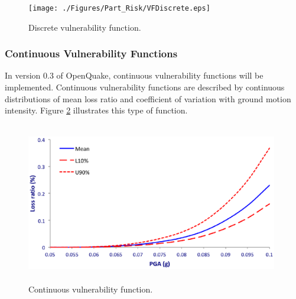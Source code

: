\begin{figure}[ht]
\centering
\texttt{[image: ./Figures/Part\_Risk/VFDiscrete.eps]}
\caption{Discrete vulnerability function.}
\label{fig:VFDiscrete}
\end{figure}

\subsubsection{Continuous Vulnerability Functions}
In version 0.3 of OpenQuake, continuous vulnerability functions will be implemented. Continuous vulnerability functions are described by continuous distributions of mean loss ratio and coefficient of variation with ground motion intensity. Figure \ref{fig:VFContinuous} illustrates this type of function.

\begin{figure}[ht]
\centering
\includegraphics[width=11cm,height=7cm]{./Figures/Part_Risk/VFContinuous}
\caption{Continuous vulnerability function.}
\label{fig:VFContinuous}
\end{figure}

